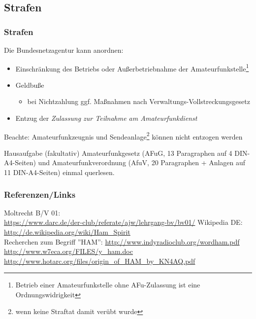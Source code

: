 \subsection{Strafen}

\begin{frame}
  \frametitle{Strafen}

  Die Bundesnetzagentur kann anordnen:

  \begin{itemize}
    \item Einschränkung des Betriebs oder Außerbetriebnahme der
      Amateurfunkstelle\footnote{Betrieb einer Amateurfunkstelle ohne
      AFu-Zulassung ist eine Ordnungswidrigkeit}
    \item Geldbuße
      \begin{itemize}
        \item bei Nichtzahlung ggf. Maßnahmen nach Verwaltungs-Vollstreckungsgesetz
      \end{itemize}
    \item Entzug der \emph{Zulassung zur Teilnahme am Amateurfunkdienst}
  \end{itemize}

  \vspace{1em}

  Beachte: Amateurfunkzeugnis und Sendeanlage\footnote{wenn keine Straftat
  damit verübt wurde} können nicht entzogen werden

\end{frame}

\begin{frame}

  \begin{alertblock}{Hausaufgabe (fakultativ)}
    Amateurfunkgesetz (AFuG, 13 Paragraphen auf 4 DIN-A4-Seiten) und
    Amateurfunkverordnung (AfuV, 20 Paragraphen + Anlagen auf 11
    DIN-A4-Seiten) einmal querlesen.
  \end{alertblock}

\end{frame}

\renewcommand{\refname}{Referenzen}

\begin{frame}
  \frametitle{Referenzen/Links}
  \hypertarget{refs}{}
  \footnotesize

  \begin{thebibliography}{}
     Moltrecht B/V 01: \\
      \url{https://www.darc.de/der-club/referate/ajw/lehrgang-bv/bv01/}
        Wikipedia DE: \\
      \url{http://de.wikipedia.org/wiki/Ham_Spirit} \\
       Recherchen zum Begriff ''HAM'':
      \url{http://www.indyradioclub.org/wordham.pdf} \\
      \url{http://www.w7eca.org/FILES/y_ham.doc} \\
      \url{http://www.hotarc.org/files/origin_of_HAM_by_KN4AQ.pdf}
  \end{thebibliography}

\end{frame}


